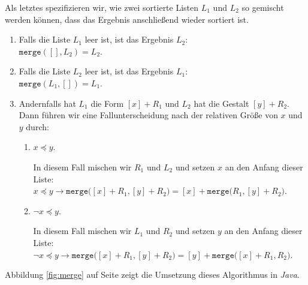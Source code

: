 Als letztes spezifizieren wir, wie zwei sortierte Listen $L_1$ 
und $L_2$ so gemischt werden k\"onnen, dass das Ergebnis anschlie{\ss}end wieder sortiert ist.
\begin{enumerate}
\item Falls die Liste $L_1$ leer ist, ist das Ergebnis $L_2$: \\[0.2cm]
      \hspace*{1.3cm} 
      $\mathtt{merge}([], L_2) = L_2$.
\item Falls die Liste $L_2$ leer ist, ist das Ergebnis $L_1$: \\[0.2cm]
      \hspace*{1.3cm} 
      $\mathtt{merge}(L_1, []) = L_1$.
\item Andernfalls hat $L_1$ die Form $[x] + R_1$ und $L_2$ hat die Gestalt $[y] + R_2$.
      Dann f\"uhren wir eine Fallunterscheidung nach der relativen Gr\"o{\ss}e von $x$ und $y$ durch:
      \begin{enumerate}
      \item $x \preceq y$.

            In diesem Fall mischen wir $R_1$ und $L_2$ und setzen $x$ an den Anfang dieser Liste:\\[0.2cm]
            \hspace*{1.3cm} 
            $x \preceq y \rightarrow \mathtt{merge}\bigl([x]+R_1, [y]+R_2\bigr) = [x] + \mathtt{merge}\bigl(R_1,[y]+R_2\bigr)$.
      \item $\neg x \preceq y$.

            In diesem Fall mischen wir $L_1$ und $R_2$ und setzen $y$ an den Anfang dieser Liste:\\[0.2cm]
            \hspace*{1.3cm} 
            $\neg x \preceq y \rightarrow \mathtt{merge}\bigl([x]+R_1, [y]+R_2\bigr) = [y] + \mathtt{merge}\bigl([x] + R_1,R_2\bigr)$.
      \end{enumerate}
\end{enumerate}
Abbildung \ref{fig:merge} auf Seite \pageref{fig:merge} 
zeigt die Umsetzung dieses Algorithmus in \textsl{Java}.

